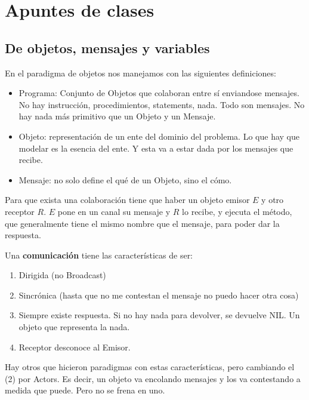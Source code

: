 \section{Apuntes de clases}

\subsection{De objetos, mensajes y variables}

En el paradigma de objetos nos manejamos con las siguientes definiciones:

\begin{itemize}
 \item Programa: Conjunto de Objetos que colaboran entre sí enviandose mensajes. No hay instrucción, procedimientos, statements, nada. Todo son mensajes. No hay nada más primitivo que un Objeto y un Mensaje. 

  \item Objeto: representación de un ente del dominio del problema. Lo que hay que modelar es la esencia del ente. Y esta va a estar dada por los mensajes que recibe. 
  
  \item Mensaje: no solo define el qué de un Objeto, sino el cómo. 

  
\end{itemize}

Para que exista una colaboración tiene que haber un objeto emisor $E$ y otro receptor $R$. $E$ pone en un canal su mensaje y $R$ lo recibe, y ejecuta el método, que generalmente tiene el mismo nombre que el mensaje, para poder dar la respuesta. 

Una \textbf{comunicación} tiene las características de ser:
\begin{enumerate}[(1)]
\item Dirigida (no Broadcast)
\item Sincrónica (hasta que no me contestan el mensaje no puedo hacer otra cosa) 
\item Siempre existe respuesta. Si no hay nada para devolver, se devuelve NIL. Un objeto que representa la nada. 
\item Receptor desconoce al Emisor. 
\end{enumerate}

Hay otros que hicieron paradigmas con estas características, pero cambiando el (2) por Actors. Es decir, un objeto va encolando mensajes y los va contestando a medida que puede. Pero no se frena en uno. 

